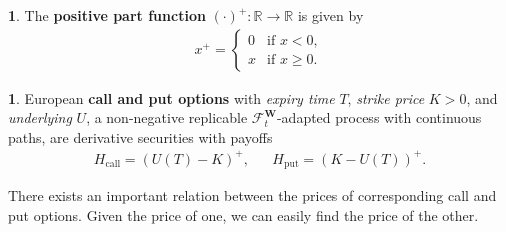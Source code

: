 \documentclass[english]{article}
\numberwithin{equation}{section}
\numberwithin{figure}{section}
\theoremstyle{bolddescit}
\theoremstyle{definition}
\newtheorem{definition}[theorem]{\protect\definitionname}
\theoremstyle{definition}
\theoremstyle{plain}
\theoremstyle{plain}
\theoremstyle{bolddesc}
\theoremstyle{plain}
\theoremstyle{remark}
\providecommand{\definitionname}{Definition}
\begin{document}
\begin{definition}
  The \textbf{positive part function} $(\cdot)^+ : \mathbb{R} \to \mathbb{R}$ is given by
  \begin{align*}
    x^+ = \left\{\begin{array}{ll}
      0 & \text{if } x < 0,\\
      x & \text{if } x \ge 0.
    \end{array}\right.
  \end{align*}
\end{definition}

\begin{definition}\label{def:bs-european-option}
  European \textbf{call and put options} with \textit{expiry time} $T$, \textit{strike price} $K > 0$, and \textit{underlying} $U$, a non-negative replicable $\mathcal{F}^\mathbf{W}_t$-adapted process with continuous paths, are derivative securities with payoffs
  \begin{align*}
    H_\text{call} = (U(T) - K)^+, && H_\text{put} = (K - U(T))^+.
  \end{align*}
\end{definition}

There exists an important relation between the prices of corresponding call and put options. Given the price of one, we can easily find the price of the other.
\end{document}
